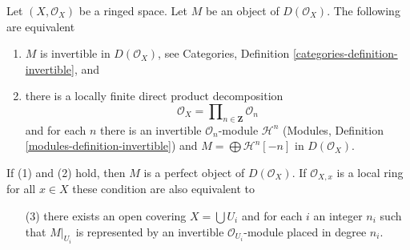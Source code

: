 \begin{lemma}
\label{lemma-invertible-derived}
Let $(X, \mathcal{O}_X)$ be a ringed space. Let $M$ be an object
of $D(\mathcal{O}_X)$. The following are equivalent
\begin{enumerate}
\item $M$ is invertible in $D(\mathcal{O}_X)$, see
Categories, Definition \ref{categories-definition-invertible}, and
\item there is a locally finite direct product decomposition
$$
\mathcal{O}_X = \prod\nolimits_{n \in \mathbf{Z}} \mathcal{O}_n
$$
and for each $n$ there is an invertible $\mathcal{O}_n$-module
$\mathcal{H}^n$ (Modules, Definition \ref{modules-definition-invertible})
and $M = \bigoplus \mathcal{H}^n[-n]$ in $D(\mathcal{O}_X)$.
\end{enumerate}
If (1) and (2) hold, then $M$ is a perfect object of $D(\mathcal{O}_X)$. If
$\mathcal{O}_{X, x}$ is a local ring for all $x \in X$ these condition
are also equivalent to
\begin{enumerate}
\item[(3)] there exists an open covering $X = \bigcup U_i$
and for each $i$ an integer $n_i$ such that $M|_{U_i}$
is represented by an invertible $\mathcal{O}_{U_i}$-module
placed in degree $n_i$.
\end{enumerate}
\end{lemma}

